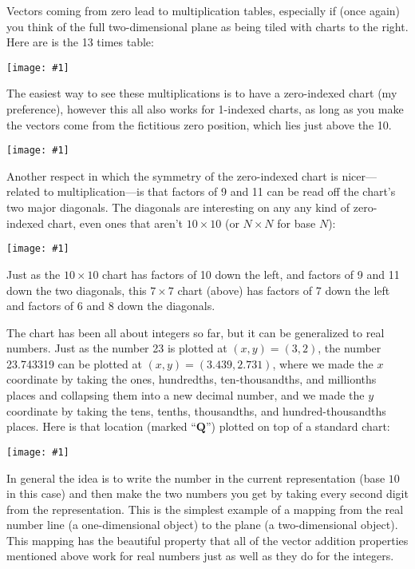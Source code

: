 \documentclass[12pt,pdftex]{article}
\newcommand{\showchart}[1]{\texttt{[image: \#1]}}
\begin{document}
Vectors coming from zero lead to multiplication tables, especially if
(once again) you think of the full two-dimensional plane as being
tiled with charts to the right.  Here are is the 13 times table:
\begin{center}
\showchart{hundreds_chart_tr_13s.pdf}
\end{center}
The easiest way to see these
multiplications is to have a zero-indexed chart (my preference),
however this all also works for 1-indexed charts, as long as you make
the vectors come from the fictitious zero position, which lies just
above the 10.
\begin{center}
\showchart{hundreds_chart_tr_index1_13s.pdf}
\end{center}

Another respect in which the symmetry of the zero-indexed chart is
nicer---related to multiplication---is that factors of 9 and 11 can be
read off the chart's two major diagonals.  The diagonals are
interesting on any any kind of zero-indexed chart, even ones that
aren't $10\times 10$ (or $N\times N$ for base $N$):
\begin{center}
\showchart{hundreds_chart_7x7_base10.pdf}
\end{center}
Just as the $10\times 10$ chart has factors of 10 down the left, and
factors of 9 and 11 down the two diagonals, this $7\times 7$ chart
(above) has factors of 7 down the left and factors of 6 and 8 down the
diagonals.

The chart has been all about integers so far, but it can be
generalized to real numbers.  Just as the number 23 is plotted at
$(x,y) = (3,2)$, the number 23.743319 can be plotted at $(x,y) =
(3.439, 2.731)$, where we made the $x$ coordinate by taking the ones,
hundredths, ten-thousandths, and millionths places and collapsing them
into a new decimal number, and we made the $y$ coordinate by taking
the tens, tenths, thousandths, and hundred-thousandths places.  Here
is that location (marked ``$\mathbf Q$'') plotted on top of a standard chart:
\begin{center}
\showchart{hundreds_chart_Q.pdf}
\end{center}
In general the idea is to write the number in the current
representation (base $10$ in this case) and then make the two numbers
you get by taking every second digit from the representation.  This is
the simplest example of a mapping from the real number line (a
one-dimensional object) to the plane (a two-dimensional object).  This
mapping has the beautiful property that all of the vector addition
properties mentioned above work for real numbers just as well as they
do for the integers.
\end{document}
